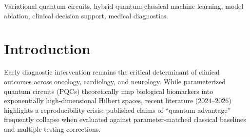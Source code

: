\documentclass[conference]{IEEEtran}
\begin{document}
\begin{IEEEkeywords}
Variational quantum circuits, hybrid quantum-classical machine learning, model ablation, clinical decision support, medical diagnostics.
\end{IEEEkeywords}

\section{Introduction}
Early diagnostic intervention remains the critical determinant of clinical outcomes across oncology, cardiology, and neurology. While parameterized quantum circuits (PQCs) theoretically map biological biomarkers into exponentially high-dimensional Hilbert spaces, recent literature (2024--2026) highlights a reproducibility crisis: published claims of ``quantum advantage'' frequently collapse when evaluated against parameter-matched classical baselines and multiple-testing corrections.
\end{document}
